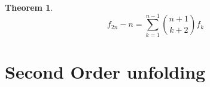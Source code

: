 \documentclass[a4paper,dottedtoc,headinclude,footinclude]{report} %
\theoremstyle{plain}
\newtheorem{thm}{Theorem}[section]
\begin{document}
    \begin{thm}
        \begin{displaymath}
            f_{2n} - n = \sum_{k=1}^{n-1}{{{n+1}\choose{k+2}}f_{k}}
        \end{displaymath}
    \end{thm}

    \section{Second Order unfolding}
    \lipsum[1]

\end{document}
